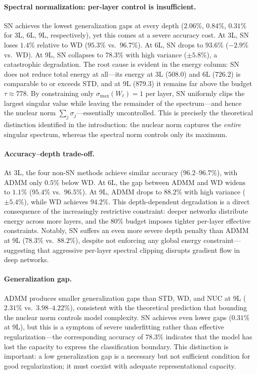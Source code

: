 \documentclass[a4paper,fleqn]{cas-sc}
\theoremstyle{remark}
\theoremstyle{definition}
\begin{document}
\paragraph{Spectral normalization: per-layer control is insufficient.}
SN achieves the lowest generalization gaps at every depth ($2.06\%$, $0.84\%$, $0.31\%$ for 3L, 6L, 9L, respectively), yet this comes at a severe accuracy cost. At 3L, SN loses $1.4\%$ relative to WD ($95.3\%$ vs.\ $96.7\%$). At 6L, SN drops to $93.6\%$ ($-2.9\%$ vs.\ WD). At 9L, SN collapses to $78.3\%$ with high variance ($\pm 5.8\%$), a catastrophic degradation. The root cause is evident in the energy column: SN does not reduce total energy at all---its energy at 3L ($508.0$) and 6L ($726.2$) is comparable to or exceeds STD, and at 9L ($879.3$) it remains far above the budget $\tau\approx 778$. By constraining only $\sigma_{\max}(W_\ell)=1$ per layer, SN uniformly clips the largest singular value while leaving the remainder of the spectrum---and hence the nuclear norm $\sum_j\sigma_j$---essentially uncontrolled. This is precisely the theoretical distinction identified in the introduction: the nuclear norm captures the \emph{entire} singular spectrum, whereas the spectral norm controls only its maximum.

\paragraph{Accuracy--depth trade-off.}
At 3L, the four non-SN methods achieve similar accuracy ($96.2$--$96.7\%$), with ADMM only $0.5\%$ below WD. At 6L, the gap between ADMM and WD widens to $1.1\%$ ($95.4\%$ vs.\ $96.5\%$). At 9L, ADMM drops to $88.2\%$ with high variance ($\pm 5.4\%$), while WD achieves $94.2\%$. This depth-dependent degradation is a direct consequence of the increasingly restrictive constraint: deeper networks distribute energy across more layers, and the $80\%$ budget imposes tighter per-layer effective constraints. Notably, SN suffers an even more severe depth penalty than ADMM at 9L ($78.3\%$ vs.\ $88.2\%$), despite not enforcing any global energy constraint---suggesting that aggressive per-layer spectral clipping disrupts gradient flow in deep networks.

\paragraph{Generalization gap.}
ADMM produces smaller generalization gaps than STD, WD, and NUC at 9L ($2.31\%$ vs.\ $3.98$--$4.22\%$), consistent with the theoretical prediction that bounding the nuclear norm controls model complexity. SN achieves even lower gaps ($0.31\%$ at 9L), but this is a symptom of severe underfitting rather than effective regularization---the corresponding accuracy of $78.3\%$ indicates that the model has lost the capacity to express the classification boundary. This distinction is important: a low generalization gap is a necessary but not sufficient condition for good regularization; it must coexist with adequate representational capacity.
\end{document}
